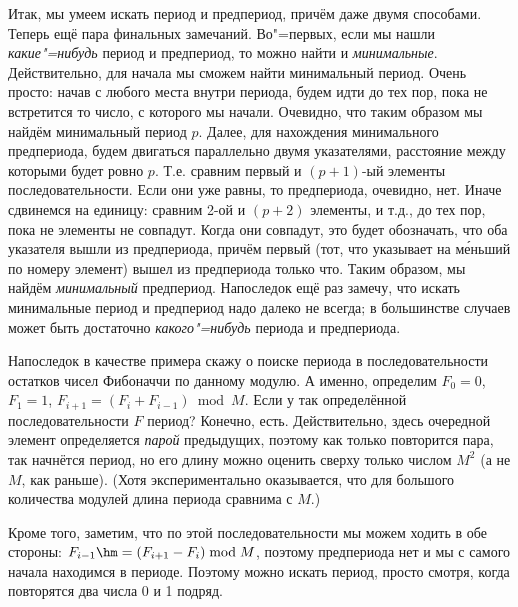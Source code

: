 Итак, мы умеем искать период и предпериод, причём даже двумя способами. Теперь ещё пара финальных 
замечаний. Во"=первых, если мы нашли \textit{какие"=нибудь} период и предпериод, то можно найти 
и \textit{минимальные}. Действительно, для начала мы сможем найти минимальный период. Очень просто: 
начав с любого места внутри периода, будем идти до тех пор, пока не встретится то число, с которого 
мы начали. Очевидно, что таким образом мы найдём минимальный период $p$. Далее, для нахождения 
минимального предпериода, будем двигаться параллельно двумя указателями, расстояние между которыми
будет ровно $p$. Т.е. сравним первый и $(p+1)$-ый элементы последовательности. Если они уже равны,
то предпериода, очевидно, нет. Иначе сдвинемся на единицу: сравним 2-ой и $(p+2)$ элементы, и т.д.,
до тех пор, пока не  элементы не совпадут. Когда они совпадут, это будет обозначать, что оба указателя 
вышли из предпериода, причём первый (тот, что указывает на м\'{е}ньший по номеру элемент) вышел из
предпериода только что. Таким образом, мы найдём \textit{минимальный} предпериод. Напоследок ещё раз
замечу, что искать минимальные период и предпериод надо далеко не всегда; в большинстве случаев
может быть достаточно \textit{какого"=нибудь} периода и предпериода.

Напоследок в качестве примера скажу о поиске периода в последовательности остатков чисел Фибоначчи
по данному модулю. А именно, определим $F_0=0$, $F_1=1$, $F_{i+1}=(F_i+F_{i-1}) \bmod M$. Если у 
так определённой последовательности $F$ период? Конечно, есть. Действительно, здесь очередной элемент
определяется \textit{парой} предыдущих, поэтому как только повторится пара, так начнётся период, но
его длину можно оценить сверху только числом $M^2$ (а не $M$, как раньше). (Хотя экспериментально 
оказывается, что для большого количества модулей длина периода сравнима с $M$.)


Кроме того, заметим, что по этой последовательности мы можем ходить в обе стороны: 
$F_{i-1}\hm=(F_{i+1}-F_i) \bmod M$, поэтому предпериода нет и мы с самого начала находимся в периоде.
Поэтому можно искать период, просто смотря, когда повторятся два числа 0 и 1 подряд.

